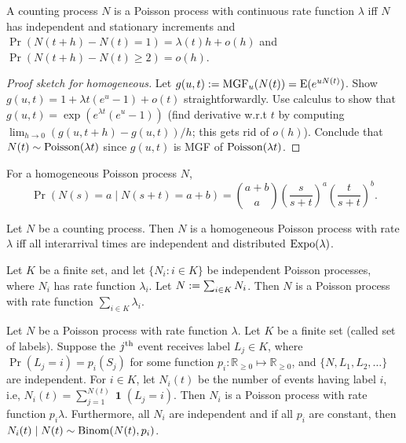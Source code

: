 \documentclass[a4paper, 12pt, fleqn]{article}
\DeclareMathOperator{\boolone}{\mathbf{1}}
\DeclareMathOperator{\MGF}{MGF}
\DeclareMathOperator{\Poisson}{\opname{Poisson}}
\DeclareMathOperator{\Expo}{\opname{Expo}}
\begin{document}
\begin{theorem}
A counting process $N$ is a Poisson process with continuous rate function $\lambda$ iff
$N$ has independent and stationary increments and
$\Pr(N(t+h)-N(t) = 1) = \lambda(t) h + o(h)$ and $\Pr(N(t+h)-N(t) \ge 2) = o(h)$.
\end{theorem}
\begin{proof}[Proof sketch for homogeneous]
Let $g(u,t) \defeq \MGF_u(N(t)) = \E(e^{uN(t)})$.
Show $g(u,t) = 1 + \lambda t(e^u-1) + o(t)$ straightforwardly.
Use calculus to show that $g(u,t) = \exp(e^{\lambda t}(e^u-1))$
(find derivative w.r.t $t$ by computing $\lim_{h \to 0} (g(u,t+h)-g(u,t))/h$; this gets rid of $o(h)$).
Conclude that $N(t) \sim \Poisson(\lambda t)$ since $g(u,t)$ is MGF of $\Poisson(\lambda t)$.
\end{proof}

\begin{lemma}
For a homogeneous Poisson process $N$,
\[ \Pr(N(s)=a \mid N(s+t)=a+b) = \binom{a+b}{a}\left(\frac{s}{s+t}\right)^a\left(\frac{t}{s+t}\right)^b. \]
\end{lemma}

\begin{theorem}
Let $N$ be a counting process. Then $N$ is a homogeneous Poisson process with rate $\lambda$
iff all interarrival times are independent and distributed $\Expo(\lambda)$.
\end{theorem}

\begin{theorem}
Let $K$ be a finite set, and let $\{N_i: i \in K\}$ be independent Poisson processes,
where $N_i$ has rate function $\lambda_i$. Let $N := \sum_{i \in K}N_i$.
Then $N$ is a Poisson process with rate function $\sum_{i \in K} \lambda_i$.
\end{theorem}

\begin{theorem}
Let $N$ be a Poisson process with rate function $\lambda$. Let $K$ be a finite set (called set of labels).
Suppose the $j^{\textrm{th}}$ event receives label $L_j \in K$, where $\Pr(L_j = i) = p_i(S_j)$
for some function $p_i: \mathbb{R}_{\ge 0} \mapsto \mathbb{R}_{\ge 0}$,
and $\{N, L_1, L_2, \ldots\}$ are independent.
For $i \in K$, let $N_i(t)$ be the number of events having label $i$, i.e,
$N_i(t) = \sum_{j=1}^{N(t)} \boolone(L_j = i)$.
Then $N_i$ is a Poisson process with rate function $p_i \lambda$.
Furthermore, all $N_i$ are independent and if all $p_i$ are constant, then
$N_i(t) \mid N(t) \sim \operatorname{Binom}(N(t), p_i)$.
\end{theorem}
\end{document}
